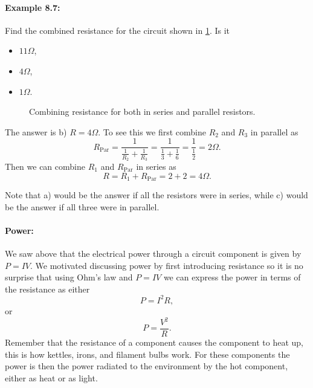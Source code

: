\paragraph{Example 8.7:} Find the combined resistance for the circuit shown in \cref{fig: combining resistance example}. Is it
\begin{itemize}
\setlength{\itemsep}{-5pt}
    \item[a)] $11\Omega$,
    \item[b)] $4\Omega$,
    \item[c)] $1\Omega$.
\end{itemize}

  \begin{figure}[ht]
    \centering
    \caption{Combining resistance for both in series and parallel resistors.}
    \label{fig: combining resistance example}
\end{figure}

The answer is b) $R=4\Omega$. To see this we first combine $R_{2}$ and $R_{3}$ in parallel as
\begin{equation*}
R_{\text{Par}}=\frac{1}{\frac{1}{R_{2}}+\frac{1}{R_{3}}}=\frac{1}{\frac{1}{3}+\frac{1}{6}}=\frac{1}{\frac{1}{2}}=2\Omega.
\end{equation*}
Then we can combine $R_{1}$ and $R_{\text{Par}}$ in series as
\begin{equation*}
R =R_{1}+R_{\text{Par}}=2+2=4\Omega.
\end{equation*}

Note that a) would be the answer if all the resistors were in series, while c) would be the answer if all three were in parallel.

\paragraph{Power:} We saw above that the electrical power through a circuit component is given by $P=IV$. We motivated discussing power by first introducing resistance so it is no surprise that using Ohm's law and $P=IV$ we can express the power in terms of the resistance as either
\begin{equation*}
P=I^{2}R,
\end{equation*}
or
\begin{equation*}
P=\frac{V^{2}}{R}.
\end{equation*}
Remember that the resistance of a component causes the component to heat up, this is how kettles, irons, and filament bulbs work. For these components the power is then the power radiated to the environment by the hot component, either as heat or as light.

